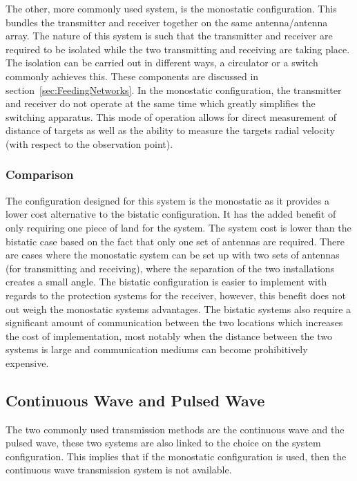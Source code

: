 \documentclass[11pt]{witseiepaper}
\begin{document}
The other, more commonly used system, is the monostatic configuration. This bundles the transmitter and receiver together on the same antenna/antenna array. The nature of this system is such that the transmitter and receiver are required to be isolated while the two transmitting and receiving are taking place. The isolation can be carried out in different ways, a circulator or a switch commonly achieves this. These components are discussed in section~\ref{sec:FeedingNetworks}. In the monostatic configuration, the transmitter and receiver do not operate at the same time which greatly simplifies the switching apparatus.
This mode of operation allows for direct measurement of distance of targets as well as the ability to measure the targets radial velocity (with respect to the observation point).

\subsubsection{Comparison} \label{sec:Comparison}

The configuration designed for this system is the monostatic as it provides a lower cost alternative to the bistatic configuration. It has the added benefit of only requiring one piece of land for the system. The system cost is lower than the bistatic case based on the fact that only one set of antennas are required. There are cases where the monostatic system can be set up with two sets of antennas (for transmitting and receiving), where the separation of the two installations creates a small angle.
The bistatic configuration is easier to implement with regards to the protection systems for the receiver, however, this benefit does not out weigh the monostatic systems advantages. The bistatic systems also require a significant amount of communication between the two locations which increases the cost of implementation, most notably when the distance between the two systems is large and communication mediums can become prohibitively expensive.

\subsection{Continuous Wave and Pulsed Wave} \label{sec:ContinuousWaveandPulsedWave}

The two commonly used transmission methods are the continuous wave and the pulsed wave, these two systems are also linked to the choice on the system configuration.
This implies that if the monostatic configuration is used, then the continuous wave transmission system is not available.
\end{document}
